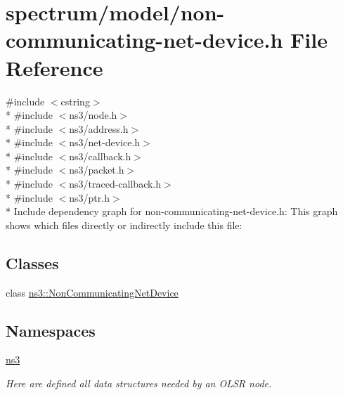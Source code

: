 \hypertarget{non-communicating-net-device_8h}{}\section{spectrum/model/non-\/communicating-\/net-\/device.h File Reference}
\label{non-communicating-net-device_8h}
{\ttfamily \#include $<$cstring$>$}\\*
{\ttfamily \#include $<$ns3/node.\+h$>$}\\*
{\ttfamily \#include $<$ns3/address.\+h$>$}\\*
{\ttfamily \#include $<$ns3/net-\/device.\+h$>$}\\*
{\ttfamily \#include $<$ns3/callback.\+h$>$}\\*
{\ttfamily \#include $<$ns3/packet.\+h$>$}\\*
{\ttfamily \#include $<$ns3/traced-\/callback.\+h$>$}\\*
{\ttfamily \#include $<$ns3/ptr.\+h$>$}\\*
Include dependency graph for non-\/communicating-\/net-\/device.h\+:
This graph shows which files directly or indirectly include this file\+:
\subsection*{Classes}
\begin{DoxyCompactItemize}
\item 
class \hyperlink{classns3_1_1NonCommunicatingNetDevice}{ns3\+::\+Non\+Communicating\+Net\+Device}
\end{DoxyCompactItemize}
\subsection*{Namespaces}
\begin{DoxyCompactItemize}
\item 
 \hyperlink{namespacens3}{ns3}
\begin{DoxyCompactList}\small\item\em Here are defined all data structures needed by an O\+L\+SR node. \end{DoxyCompactList}\end{DoxyCompactItemize}
